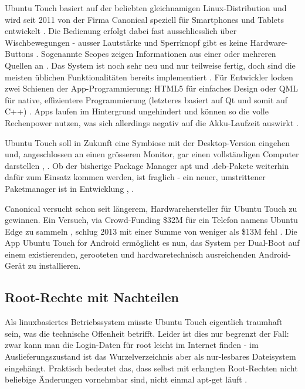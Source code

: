 Ubuntu Touch basiert auf der beliebten gleichnamigen Linux-Distribution und wird seit 2011 von der Firma Canonical speziell für Smartphones und Tablets entwickelt \cite{online:ubuntutouch-features}. Die Bedienung erfolgt dabei fast ausschliesslich über Wischbewegungen - ausser Lautstärke und Sperrknopf gibt es keine Hardware-Buttons \cite{online:ubuntutouch-blick}. Sogenannte Scopes zeigen Informationen aus einer oder mehreren Quellen an \cite{online:ubuntutouch-scopes}. Das System ist noch sehr neu und nur teilweise fertig, doch sind die meisten üblichen Funktionalitäten bereits implementiert \cite{online:ubuntutouch-blick}. Für Entwickler locken zwei Schienen der App-Programmierung: HTML5 für einfaches Design oder QML für native, effizientere Programmierung (letzteres basiert auf Qt und somit auf C++) \cite{online:ubuntutouch-developers}. Apps laufen im Hintergrund ungehindert und können so die volle Rechenpower nutzen, was sich allerdings negativ auf die Akku-Laufzeit auswirkt \cite{online:ubuntutouch-blick}.

Ubuntu Touch soll in Zukunft eine Symbiose mit der Desktop-Version eingehen und, angeschlossen an einen grösseren Monitor, gar einen vollständigen Computer darstellen \cite{online:ubuntutouch-advantages}, \cite{online:ubuntutouch-edge}. Ob der bisherige Package Manager apt und .deb-Pakete weiterhin dafür zum Einsatz kommen werden, ist fraglich - ein neuer, umstrittener Paketmanager ist in Entwicklung \cite{online:ubuntutouch-snappy}, \cite{online:ubuntutouch-snappytalk}.

Canonical versucht schon seit längerem, Hardwarehersteller für Ubuntu Touch zu gewinnen. Ein Versuch, via Crowd-Funding \$32M für ein Telefon namens Ubuntu Edge zu sammeln \cite{online:ubuntutouch-edge}, schlug 2013 mit einer Summe von weniger als \$13M fehl \cite{online:ubuntutouch-edgefail}. Die App Ubuntu Touch for Android ermöglicht es nun, das System per Dual-Boot auf einem existierenden, gerooteten und hardwaretechnisch ausreichenden Android-Gerät zu installieren.

\subsection{Root-Rechte mit Nachteilen}
Als linuxbasiertes Betriebssystem müsste Ubuntu Touch eigentlich traumhaft sein, was die technische Offenheit betrifft. Leider ist dies nur begrenzt der Fall: zwar kann man die Login-Daten für root leicht im Internet finden - im Auslieferungszustand ist das Wurzelverzeichnis aber als nur-lesbares Dateisystem eingehängt. Praktisch bedeutet das, dass selbst mit erlangten Root-Rechten nicht beliebige Änderungen vornehmbar sind, nicht einmal apt-get läuft \cite{online:ubuntutouch-aptget}.

